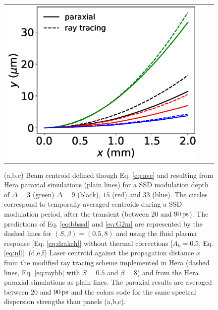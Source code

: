 \documentclass[%
 reprint,
 amsmath,amssymb,
 aps,
]{revtex4-1}
\begin{document}
\begin{figure}
\begin{tabular}{ccc}
\includegraphics[scale=0.32]{Fig2f.eps}
\end{tabular}
\caption{ \label{fig:ssd} 
(a,b,c) Beam centroid defined though Eq. \eqref{eq:ave} and resulting from Hera paraxial simulations (plain lines) for a SSD modulation depth of  $\Delta =3$ (green)
$\Delta =9$ (black), $15$ (red) and $33$ (blue). The circles correspond to temporally averaged centroids during a SSD modulation period, after the transient (between $20$ and $90\,\rm ps$). 
The predictions of Eq. \eqref{eq:bbssd} and \eqref{eq:G2m} are represented by the dashed lines for $(S,\beta)=(0.5,8)$ and using the fluid plasma response [Eq. \eqref{eq:drakeh}] without thermal corrections [$A_k=0.5$, Eq. \eqref{eq:nl}].
(d,e,f) Laser centroid against the propagation distance $x$ from the modified ray tracing scheme implemented in Hera (dashed lines, Eq. \eqref{eq:raybb} with $S=0.5$ and $\beta=8$) and from the Hera paraxial simulations as plain lines. The paraxial results are averaged between $20$ and $90\,\rm ps$ and the colors code for the same spectral dispersion strengths than panels (a,b,c). 
}
\end{figure}
\end{document}
